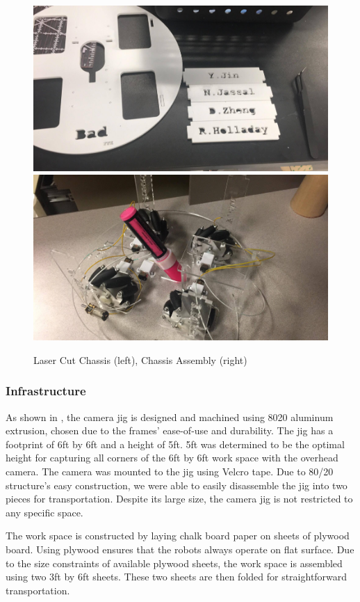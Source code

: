 \begin{figure}[h!]
\centering
\includegraphics[width=0.49\columnwidth]{figs/chassis1.png}
\includegraphics[width=0.49\columnwidth]{figs/chassis2.png}
\caption{Laser Cut Chassis (left), Chassis Assembly (right)}
\label{fig:so4}
\end{figure}

\subsubsection{Infrastructure}
\label{sec:me_infrastructure}
As shown in , the camera jig is designed and machined using 8020 aluminum extrusion, chosen due to the frames’ ease-of-use and durability. The jig has a footprint of 6ft by 6ft and a height of 5ft.  5ft was determined to be the optimal height for capturing all corners of the 6ft by 6ft work space with the overhead camera. The camera was mounted to the jig using Velcro tape. Due to 80/20 structure’s easy construction, we were able to easily disassemble the jig into two pieces for transportation. Despite its large size, the camera jig is not restricted to any specific space.

The work space is constructed by laying chalk board paper on sheets of plywood board. Using plywood ensures that the robots always operate on flat surface. Due to the size constraints of available plywood sheets, the work space is assembled using two 3ft by 6ft sheets. These two sheets are then folded for straightforward transportation.


